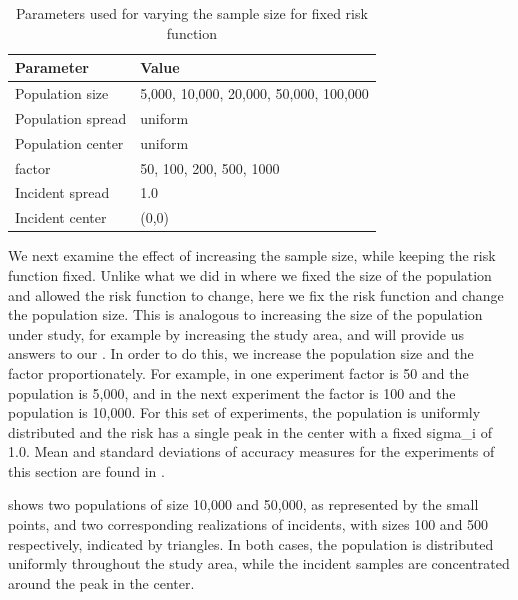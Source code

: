 \begin{table}[htbp]
    \centering
    \begin{tabular}{ll}
        \toprule
        Parameter & Value \\
        \midrule
        Population size & 5,000, 10,000, 20,000, 50,000, 100,000 \\
        Population \gls{spread} & uniform \\
        Population center & uniform \\
        \Gls{factor} & 50, 100, 200, 500, 1000 \\
        Incident \gls{spread} & 1.0 \\
        Incident center & (0,0) \\
        \bottomrule
    \end{tabular}
    \caption{Parameters used for varying the sample size for fixed risk function}
    \label{tab:params:unifNpop_1h}
\end{table}

We next examine the effect of increasing the sample size, while keeping the risk function fixed.
Unlike what we did in  where we fixed the size of the population and allowed the risk function to change,
here we fix the risk function and change the population size.
This is analogous to increasing the size of the population under study,
for example by increasing the study area,
and will provide us answers to our .
In order to do this, we increase the population size and the \gls{factor} proportionately.
For example, in one experiment \gls{factor} is 50 and the population is 5,000,
and in the next experiment the \gls{factor} is 100 and the population is 10,000.
For this set of experiments, the population is uniformly distributed and the risk has a single peak in the center with a fixed \gls{sigma_i} of 1.0.
Mean and standard deviations of accuracy measures for the experiments of this section are found in .

 shows two populations of size 10,000 and 50,000,
as represented by the small points,
and two corresponding realizations of \glspl{incident},
with sizes 100 and 500 respectively,
indicated by triangles.
In both cases,
the population is distributed uniformly throughout the study area,
while the incident samples are concentrated around the peak in the center.

